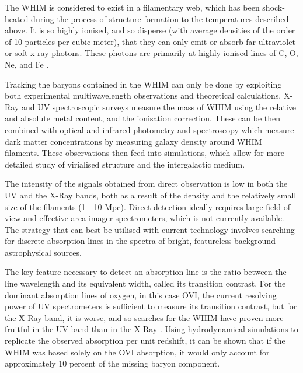 \par The WHIM is considered to exist in a filamentary web, which has been shock-heated during the process of structure formation to the temperatures described above. It is so highly ionised, and so disperse (with average densities of the order of 10 particles per cubic meter), that they can only emit or absorb far-ultraviolet or soft x-ray photons. These photons are primarily at highly ionised lines of C, O, Ne, and Fe \citep{2006ApJ...650..573C}.

\par Tracking the baryons contained in the WHIM can only be done by exploiting both experimental multiwavelength observations and theoretical calculations. X-Ray and UV spectroscopic surveys measure the mass of WHIM using the relative and absolute metal content, and the ionisation correction. These can be then combined with optical and infrared photometry and spectroscopy which measure dark matter concentrations by measuring galaxy density around WHIM filaments. These observations then feed into simulations, which allow for more detailed study of virialised structure and the intergalactic medium.

\par The intensity of the signals obtained from direct observation is low in both the UV and the X-Ray bands, both as a result of the density and the relatively small size of the filaments (1 - 10 Mpc). Direct detection ideally requires large field of view and effective area imager-spectrometers, which is not currently available. The strategy that can best be utilised with current technology involves searching for discrete absorption lines in the spectra of bright, featureless background astrophysical sources. 

\par The key feature necessary to detect an absorption line is the ratio between the line wavelength and its equivalent width, called its transition contrast. For the dominant absorption lines of oxygen, in this case OVI, the current resolving power of UV spectrometers is sufficient to measure its transition contrast, but for the X-Ray band, it is worse, and so searches for the WHIM have proven more fruitful in the UV band than in the X-Ray \citep{2005ApJ...624..555D,2006A&A...445..827R}. Using hydrodynamical simulations to replicate the observed absorption per unit redshift, it can be shown that if the WHIM was based solely on the OVI absorption, it would only account for approximately 10 percent of the missing baryon component. 

